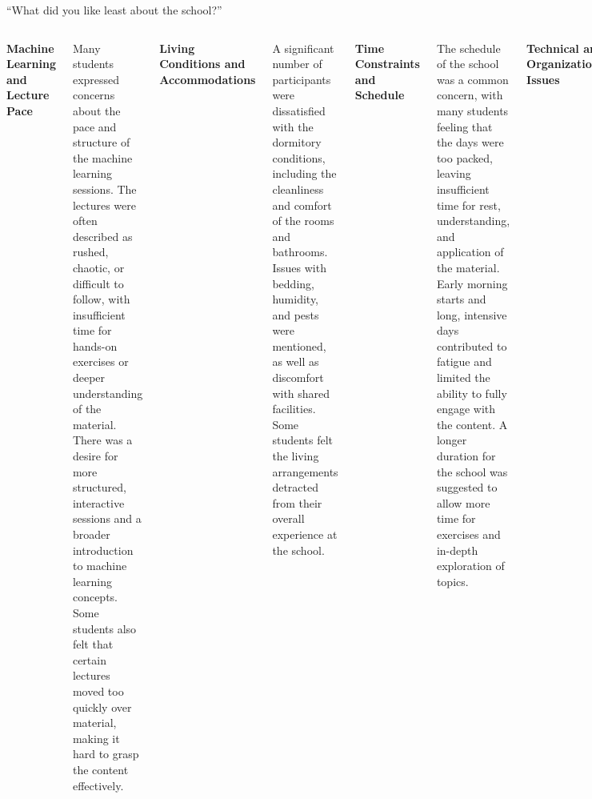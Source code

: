 \documentclass[aspectratio=169]{beamer}
\begin{document}
\begin{frame}{``What did you like least about the school?''}
\tiny
\vspace{0.25 cm}
\begin{columns}
{\bf\small Machine Learning and Lecture Pace}

Many students expressed concerns about the pace and structure of the machine learning sessions. The lectures were often described as rushed, chaotic, or difficult to follow, with insufficient time for hands-on exercises or deeper understanding of the material. There was a desire for more structured, interactive sessions and a broader introduction to machine learning concepts. Some students also felt that certain lectures moved too quickly over material, making it hard to grasp the content effectively.

\vspace{0.2 cm}
{\bf\small Living Conditions and Accommodations}

A significant number of participants were dissatisfied with the dormitory conditions, including the cleanliness and comfort of the rooms and bathrooms. Issues with bedding, humidity, and pests were mentioned, as well as discomfort with shared facilities. Some students felt the living arrangements detracted from their overall experience at the school.

\vspace{0.2 cm}
{\bf\small Time Constraints and Schedule}

The schedule of the school was a common concern, with many students feeling that the days were too packed, leaving insufficient time for rest, understanding, and application of the material. Early morning starts and long, intensive days contributed to fatigue and limited the ability to fully engage with the content. A longer duration for the school was suggested to allow more time for exercises and in-depth exploration of topics.

\vspace{0.2 cm}
{\bf\small Technical and Organizational Issues}

Several students experienced technical difficulties during the sessions, which affected their learning experience. Problems with software setup, internet connectivity, and technical support were noted. Some lectures were poorly organized, with inconsistent setups for exercises and technical issues that interrupted the flow of learning. There was a call for better preparation and organization to streamline these processes.


\end{columns}
\end{frame}
\end{document}
